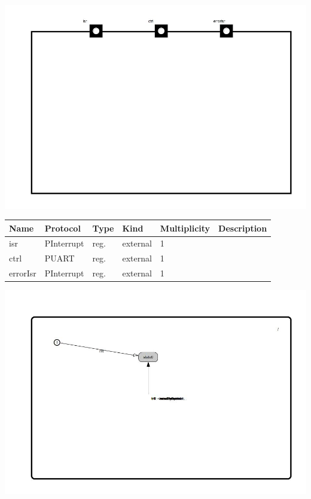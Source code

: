 
{
\centering{}
\includegraphics[width=1.0\textwidth]{./images/AUart6_structure.jpg}
}

\begin{tabular}[ht]{|l|l|l|l|l|p{5cm}|}
\hline
\textbf{Name} & \textbf{Protocol} & \textbf{Type} & \textbf{Kind} & \textbf{Multiplicity} & \textbf{Description}\\
\hline
isr & PInterrupt & reg. & external & 1 & \\
\hline
ctrl & PUART & reg. & external & 1 & \\
\hline
errorIsr & PInterrupt & reg. & external & 1 & \\
\hline
\end{tabular}

{
\centering{}
\includegraphics[width=1.0\textwidth]{./images/AUart6_behavior.jpg}
}

\begin{par}

\end{par}



